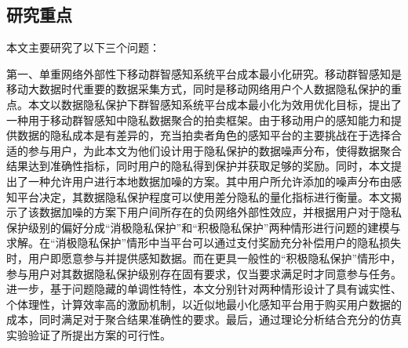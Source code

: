 

\subsection{研究重点}

本文主要研究了以下三个问题：

第一、单重网络外部性下移动群智感知系统平台成本最小化研究。移动群智感知是移动大数据时代重要的数据采集方式，同时是移动网络用户个人数据隐私保护的重点。本文以数据隐私保护下群智感知系统平台成本最小化为效用优化目标，提出了一种用于移动群智感知中隐私数据聚合的拍卖框架。由于移动用户的感知能力和提供数据的隐私成本是有差异的，充当拍卖者角色的感知平台的主要挑战在于选择合适的参与用户，为此本文为他们设计用于隐私保护的数据噪声分布，使得数据聚合结果达到准确性指标，同时用户的隐私得到保护并获取足够的奖励。同时，本文提出了一种允许用户进行本地数据加噪的方案。其中用户所允许添加的噪声分布由感知平台决定，其数据隐私保护程度可以使用差分隐私的量化指标进行衡量。本文揭示了该数据加噪的方案下用户间所存在的{\kaishu 负网络外部性}效应，并根据用户对于隐私保护级别的偏好分成“消极隐私保护”和“积极隐私保护”两种情形进行问题的建模与求解。在“消极隐私保护”情形中当平台可以通过支付奖励充分补偿用户的隐私损失时，用户即愿意参与并提供感知数据。而在更具一般性的“积极隐私保护”情形中，参与用户对其数据隐私保护级别存在固有要求，仅当要求满足时才同意参与任务。进一步，基于问题隐藏的单调性特性，本文分别针对两种情形设计了具有诚实性、个体理性，计算效率高的激励机制，以近似地最小化感知平台用于购买用户数据的成本，同时满足对于聚合结果准确性的要求。最后，通过理论分析结合充分的仿真实验验证了所提出方案的可行性。

